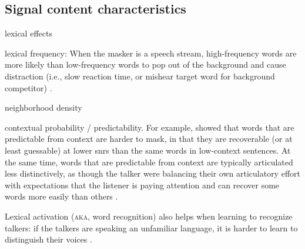 
\subsection{Signal content characteristics}
\begin{itm}
	\item{lexical effects \citep{HoenEtAl2007, BoulengerEtAl2010, BrouwerEtAl2012}}
	\item{lexical frequency: When the masker is a speech stream, high-frequency words are more likely than low-frequency words to pop out of the background and cause distraction (i.e., slow reaction time, or mishear target word for background competitor) \citep{BoulengerEtAl2010}.}
	\item{neighborhood density}
	\item{contextual probability / predictability.  For example, \citet{LewisEtAl1988} showed that words that are predictable from context are harder to mask, in that they are recoverable (or at least guessable) at lower \ac{snr}s than the same words in low-context sentences.  At the same time, words that are predictable from context are typically articulated less distinctively, as though the talker were balancing their own articulatory effort with expectations that the listener is paying attention and can recover some words more easily than others \citep{Wright2004}.  }
	\item{Lexical activation (\textsc{aka}, word recognition) also helps when learning to recognize talkers: if the talkers are speaking an unfamiliar language, it is harder to learn to distinguish their voices \citep{PerrachioneWong2007}.}
\end{itm}


